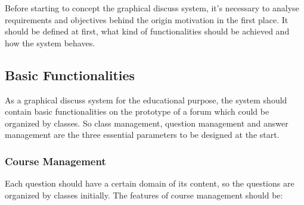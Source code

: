 Before starting to concept the graphical discuss system, it's necessary to analyse requirements and objectives behind the origin motivation in the first place. It should be defined at first, what kind of functionalities should be achieved and how the system behaves.

\subsection{Basic Functionalities}

As a graphical discuss system for the educational purpose, the system should contain basic functionalities on the prototype  of a forum which could be organized by classes. So class management, question management and answer management are the three essential parameters to be designed at the start.

\subsubsection{Course Management}

Each question should have a certain domain of its content, so the questions are organized by classes initially. The features of course management should be:

